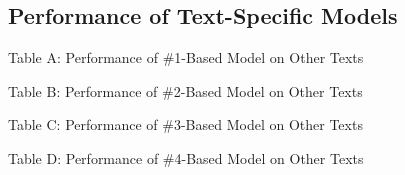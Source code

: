 %
%
%
%
%
%
%
%

\begin{subappendices}
\section{Performance of Text-Specific Models}

Table A: Performance of \#1-Based Model on Other Texts
  
Table B: Performance of \#2-Based Model on Other Texts
  
Table C: Performance of \#3-Based Model on Other Texts
  
Table D: Performance of \#4-Based Model on Other Texts
\end{subappendices}

